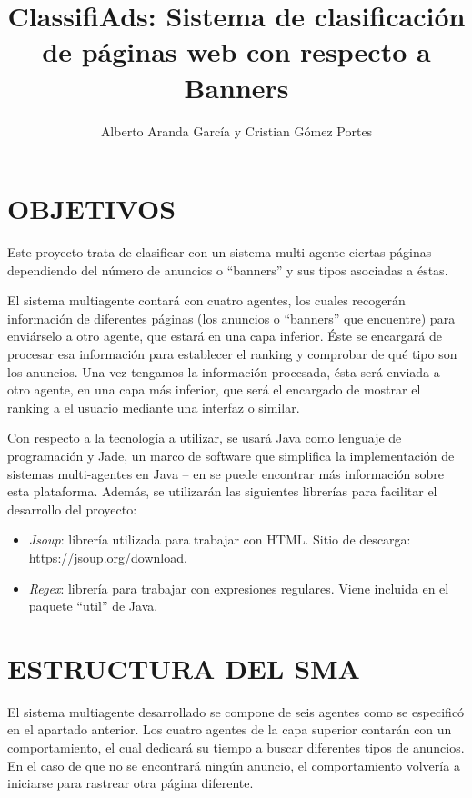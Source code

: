 \documentclass{pre-tfg}
\title{ClassifiAds: Sistema de clasificación de páginas web con respecto a Banners}
\author{Alberto Aranda García y Cristian Gómez Portes}
\begin{document}
\maketitle
\tableofcontents

\newpage

\section{OBJETIVOS}

Este proyecto trata de clasificar con un sistema multi-agente ciertas páginas dependiendo del número de anuncios o ``banners'' y sus tipos asociadas a éstas.

El sistema multiagente contará con cuatro agentes, los cuales recogerán información de diferentes páginas (los anuncios o ``banners'' que encuentre) para enviárselo a otro agente, que estará en una capa inferior. Éste se encargará de procesar esa información para establecer el ranking y comprobar de qué tipo son los anuncios. Una vez tengamos la información procesada, ésta será enviada a otro agente, en una capa más inferior, que será el encargado de mostrar el ranking a el usuario mediante una interfaz o similar.

Con respecto a la tecnología a utilizar, se usará Java como lenguaje de programación y Jade, un marco de software que simplifica la implementación de sistemas multi-agentes en Java -- en \cite{bellifemine2002jade} se puede encontrar más información sobre esta plataforma. Además, se utilizarán las siguientes librerías para facilitar el desarrollo del proyecto:

\begin{itemize}
 \item \textit{Jsoup}: librería utilizada para trabajar con HTML. Sitio de descarga: \url{https://jsoup.org/download}.
\item  \textit{Regex}: librería para trabajar con expresiones regulares. Viene incluida en el paquete ``util'' de Java.
\end{itemize}

\section{ESTRUCTURA DEL SMA}
El sistema multiagente desarrollado se compone de seis agentes como se especificó en el apartado anterior. Los cuatro agentes de la capa superior contarán con un comportamiento, el cual dedicará su tiempo a buscar diferentes tipos de anuncios. En el caso de que no se encontrará ningún anuncio, el comportamiento volvería a iniciarse para rastrear otra página diferente.
\end{document}
